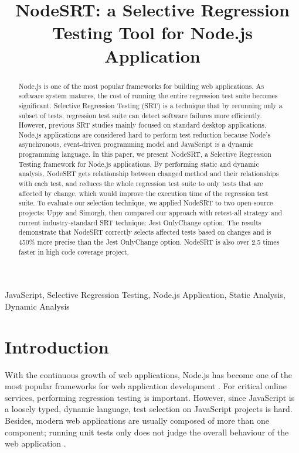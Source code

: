 \documentclass[10pt, conference]{IEEEtran}
\begin{document}
\title{NodeSRT: a Selective Regression Testing Tool for Node.js Application}

\author{
}

\maketitle

\begin{abstract}
Node.js is one of the most popular frameworks for building web applications. As software system 
matures, the cost of running the entire regression test suite becomes significant. 
Selective Regression Testing (SRT) is a technique that by rerunning only a subset of tests, regression test suite can detect software failures more efficiently. 
However, previous SRT studies mainly focused on standard desktop applications. Node.js applications are 
considered hard to perform test reduction because Node's asynchronous, event-driven programming model and 
JavaScript is a dynamic programming language. 
In this paper, we present NodeSRT, a Selective Regression Testing framework for Node.js applications. 
By performing static and dynamic analysis, NodeSRT gets relationship between changed method and their 
relationships with each test, and reduces the whole regression test suite to only tests that are 
affected by change, which would improve the execution time of the regression test suite. 
To evaluate our selection technique, we applied NodeSRT to two open-source projects: Uppy and Simorgh, 
then compared our approach with retest-all strategy and current industry-standard SRT technique: Jest 
OnlyChange option. The results demonstrate that NodeSRT correctly selects affected tests based on 
changes and is 450\% more precise than the Jest OnlyChange option. NodeSRT is also over 2.5 times faster in 
high code coverage project.
    
\end{abstract}

\begin{IEEEkeywords}
JavaScript, Selective Regression Testing, Node.js Application, Static Analysis, Dynamic Analysis
\end{IEEEkeywords}

\section{Introduction}
With the continuous growth of web applications, Node.js has become one of the most popular frameworks 
for web application development \cite{b16}. For critical online services, performing regression testing is important. However, 
since JavaScript is a loosely typed, dynamic language, test 
selection on JavaScript projects is hard. Besides, modern web applications are usually composed of 
more than one component; running unit tests only does not judge the overall behaviour of the web 
application \cite{b8}. 
\end{document}
